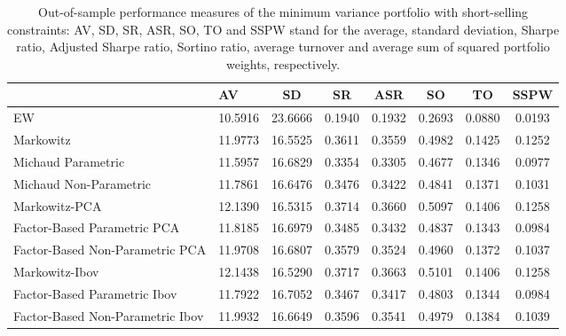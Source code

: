 \begin{table}

\caption{\label{tab:empirical_mvp}Out-of-sample performance measures of the minimum variance portfolio with short-selling constraints: AV, SD, SR, ASR, SO, TO and SSPW stand for the average, standard deviation, Sharpe ratio, Adjusted Sharpe ratio, Sortino ratio, average turnover and average sum of squared portfolio weights, respectively.}
\centering
\begin{tabular}[t]{l|l|c|c|c|c|c|c}
\hline
  & AV & SD & SR & ASR & SO & TO & SSPW\\
\hline
EW & 10.5916 & 23.6666 & 0.1940 & 0.1932 & 0.2693 & 0.0880 & 0.0193\\
\hline
Markowitz & 11.9773 & 16.5525 & 0.3611 & 0.3559 & 0.4982 & 0.1425 & 0.1252\\
\hline
Michaud Parametric & 11.5957 & 16.6829 & 0.3354 & 0.3305 & 0.4677 & 0.1346 & 0.0977\\
\hline
Michaud Non-Parametric & 11.7861 & 16.6476 & 0.3476 & 0.3422 & 0.4841 & 0.1371 & 0.1031\\
\hline
Markowitz-PCA & 12.1390 & 16.5315 & 0.3714 & 0.3660 & 0.5097 & 0.1406 & 0.1258\\
\hline
Factor-Based Parametric PCA & 11.8185 & 16.6979 & 0.3485 & 0.3432 & 0.4837 & 0.1343 & 0.0984\\
\hline
Factor-Based Non-Parametric PCA & 11.9708 & 16.6807 & 0.3579 & 0.3524 & 0.4960 & 0.1372 & 0.1037\\
\hline
Markowitz-Ibov & 12.1438 & 16.5290 & 0.3717 & 0.3663 & 0.5101 & 0.1406 & 0.1258\\
\hline
Factor-Based Parametric Ibov & 11.7922 & 16.7052 & 0.3467 & 0.3417 & 0.4803 & 0.1344 & 0.0984\\
\hline
Factor-Based Non-Parametric Ibov & 11.9932 & 16.6649 & 0.3596 & 0.3541 & 0.4979 & 0.1384 & 0.1039\\
\hline
\end{tabular}
\end{table}
